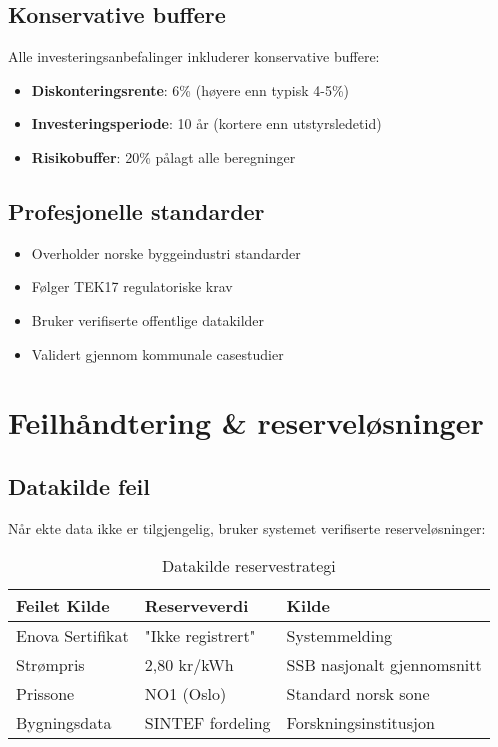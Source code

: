 \documentclass[12pt,a4paper]{article}
\begin{document}
\subsection{Konservative buffere}

Alle investeringsanbefalinger inkluderer konservative buffere:

\begin{itemize}
\item \textbf{Diskonteringsrente}: 6\% (høyere enn typisk 4-5\%)
\item \textbf{Investeringsperiode}: 10 år (kortere enn utstyrsledetid)
\item \textbf{Risikobuffer}: 20\% pålagt alle beregninger
\end{itemize}

\subsection{Profesjonelle standarder}

\begin{itemize}
\item Overholder norske byggeindustri standarder
\item Følger TEK17 regulatoriske krav
\item Bruker verifiserte offentlige datakilder
\item Validert gjennom kommunale casestudier
\end{itemize}

\section{Feilhåndtering \& reserveløsninger}

\subsection{Datakilde feil}

Når ekte data ikke er tilgjengelig, bruker systemet verifiserte reserveløsninger:

\begin{table}[H]
\centering
\begin{tabular}{|l|l|l|}
\hline
\textbf{Feilet Kilde} & \textbf{Reserveverdi} & \textbf{Kilde} \\
\hline
Enova Sertifikat & "Ikke registrert" & Systemmelding \\
Strømpris & 2,80 kr/kWh & SSB nasjonalt gjennomsnitt \\
Prissone & NO1 (Oslo) & Standard norsk sone \\
Bygningsdata & SINTEF fordeling & Forskningsinstitusjon \\
\hline
\end{tabular}
\caption{Datakilde reservestrategi}
\end{table}
\end{document}
